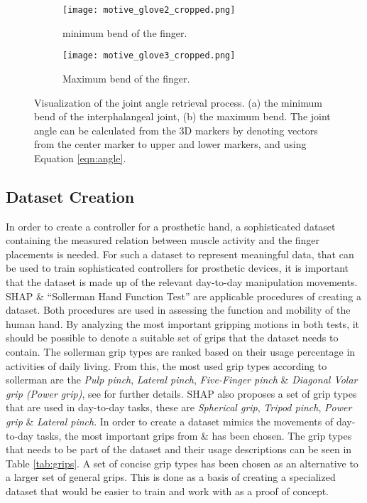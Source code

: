 \documentclass[../main.tex]{subfiles}
\begin{document}
\begin{figure}[H]
    \begin{subfigure}[b]{0.49\textwidth}
        \centering
        \texttt{[image: motive\_glove2\_cropped.png]}
        \caption{minimum bend of the finger.}
        \label{fig:minbend}
    \end{subfigure}
    \hfill
    \begin{subfigure}[b]{0.49\textwidth}
        \centering
        \texttt{[image: motive\_glove3\_cropped.png]}
        \caption{Maximum bend of the finger.}
        \label{fig:maxbend}
    \end{subfigure}
    \caption{Visualization of the joint angle retrieval process. (a) the minimum bend of the \gls{interphalangeal joint}, (b) the maximum bend. The joint angle can be calculated from the 3D markers by denoting vectors from the center marker to upper and lower markers, and using Equation \eqref{eqn:angle}.}

\end{figure}

\subsection{Dataset Creation}
\label{sec:dataset}

In order to create a controller for a prosthetic hand, a sophisticated dataset containing the measured relation between muscle activity and the finger placements is needed.
For such a dataset to represent meaningful data, that can be used to train sophisticated controllers for prosthetic devices, it is important that the dataset is made up of the relevant day-to-day manipulation movements.
\gls{SHAP} \cite{shap} \& ``Sollerman Hand  Function Test''  \cite{sollerman} are applicable procedures of creating a dataset.
Both procedures are used in assessing the function and mobility of the human hand.
By analyzing the most important gripping motions in both tests, it should be possible to denote a suitable set of grips that the dataset needs to contain.
The sollerman grip types are ranked based on their usage percentage in activities of daily living.
From this, the most used grip types according to sollerman are the \textit{Pulp pinch}, \textit{Lateral pinch}, \textit{Five-Finger pinch} \& \textit{Diagonal Volar grip (Power grip)}, see \cite{sollerman} for further details.
SHAP also proposes a set of grip types that are used in day-to-day tasks, these are \textit{Spherical grip}, \textit{Tripod pinch}, \textit{Power grip} \& \textit{Lateral pinch}.
In order to create a dataset mimics the movements of day-to-day tasks, the most important grips from \cite{sollerman} \& \cite{shap} has been chosen.
The grip types that needs to be part of the dataset and their usage descriptions can be seen in Table \ref{tab:grips}.
A set of concise grip types has been chosen as an alternative to a larger set of general grips.
This is done as a basis of creating a specialized dataset that would be easier to train and work with as a proof of concept.
\end{document}
